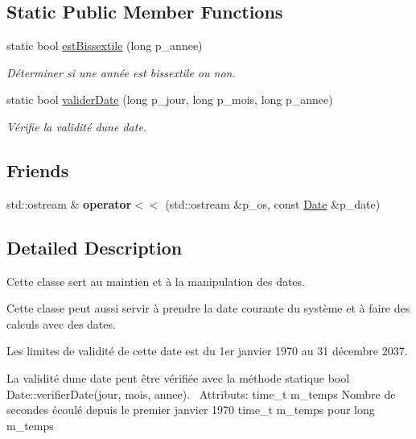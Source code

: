 \subsection*{Static Public Member Functions}
\begin{DoxyCompactItemize}
\item 
static bool \hyperlink{classutil_1_1Date_af80efec6a713cdb671d8b23c3e8c4efb}{est\+Bissextile} (long p\+\_\+annee)
\begin{DoxyCompactList}\small\item\em Déterminer si une année est bissextile ou non. \end{DoxyCompactList}\item 
static bool \hyperlink{classutil_1_1Date_af4b4dde01395754245a42483358cb538}{valider\+Date} (long p\+\_\+jour, long p\+\_\+mois, long p\+\_\+annee)
\begin{DoxyCompactList}\small\item\em Vérifie la validité d\textquotesingle{}une date. \end{DoxyCompactList}\end{DoxyCompactItemize}
\subsection*{Friends}
\begin{DoxyCompactItemize}
\item 
\mbox{\label{classutil_1_1Date_ab01372aff5a2aa1d5f5bab251bb7951c}} 
std\+::ostream \& {\bfseries operator$<$$<$} (std\+::ostream \&p\+\_\+os, const \hyperlink{classutil_1_1Date}{Date} \&p\+\_\+date)
\end{DoxyCompactItemize}


\subsection{Detailed Description}
Cette classe sert au maintien et à la manipulation des dates. 

Cette classe peut aussi servir à prendre la date courante du système et à faire des calculs avec des dates. 

Les limites de validité de cette date est du 1er janvier 1970 au 31 décembre 2037. 

La validité d\textquotesingle{}une date peut être vérifiée avec la méthode statique bool Date\+::verifier\+Date(jour, mois, annee).~\newline
 Attributs\+: time\+\_\+t m\+\_\+temps Nombre de secondes écoulé depuis le premier janvier 1970 time\+\_\+t m\+\_\+temps pour long m\+\_\+temps 

